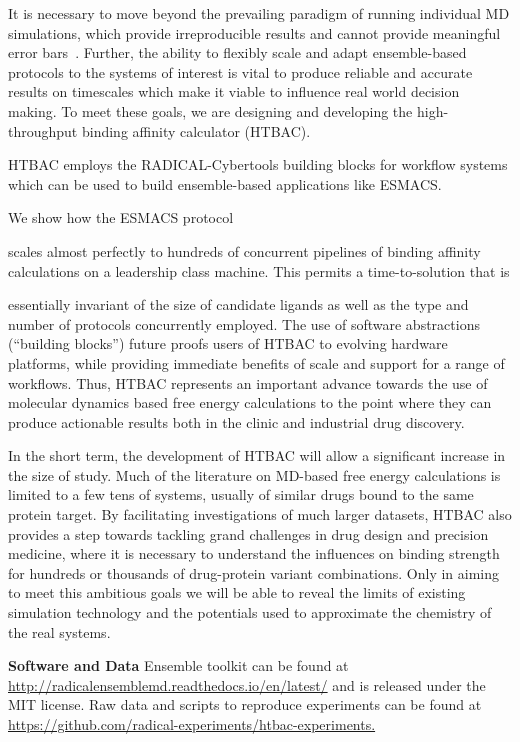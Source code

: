 
It is necessary to move beyond the prevailing paradigm of running individual
MD simulations, which provide irreproducible results and cannot provide
meaningful error bars~\cite{Bhati2017}. Further, the ability to flexibly
scale and adapt ensemble-based protocols to the systems of interest is vital
to produce reliable and accurate results on timescales which make it viable
to influence real world decision making. To meet these goals, we %
are 
designing and developing the high-throughput binding affinity calculator
(HTBAC).

HTBAC employs the RADICAL-Cybertools building blocks for workflow systems
which can be used to build ensemble-based applications like ESMACS. 

 We show how the ESMACS protocol
 

scales almost perfectly to
hundreds of concurrent pipelines of binding affinity calculations on a
leadership class machine. 
This permits a time-to-solution that is
 

essentially invariant of the size of candidate ligands as well as
the type and number of protocols concurrently employed. The use of software
abstractions (``building blocks'') future proofs users of HTBAC to evolving
hardware platforms, while providing immediate benefits of scale and support
for a range of workflows. Thus, HTBAC represents an important advance towards
the use of molecular dynamics based free energy calculations to the point
where they can produce actionable results both in the clinic and industrial
drug discovery.

In the short term, the development of HTBAC will allow a significant increase
in the size of study. Much of the literature on MD-based free energy
calculations is limited to a few tens of systems, usually of similar drugs
bound to the same protein target. By facilitating investigations of much
larger datasets, HTBAC also provides a step towards tackling grand challenges
in drug design and precision medicine, where it is necessary to understand
the influences on binding strength for hundreds or thousands of drug-protein
variant combinations. Only in aiming to meet this ambitious goals we will be
able to reveal the limits of existing simulation technology and the
potentials used to approximate the chemistry of the real systems.

\footnotesize \textbf{Software and Data} Ensemble toolkit can be found at
\url{http://radicalensemblemd.readthedocs.io/en/latest/} and is released
under the MIT license. Raw data and scripts to reproduce experiments can be
found at \url{https://github.com/radical-experiments/htbac-experiments.}
